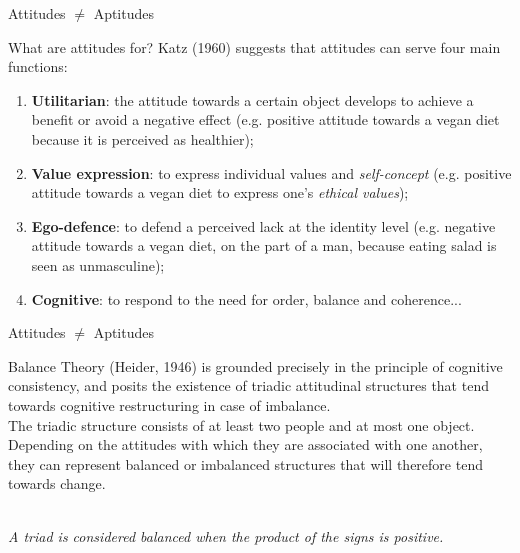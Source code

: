 \documentclass{beamer}
\begin{document}
\begin{frame}{Attitudes $\neq$ Aptitudes}
    \begin{block}{What are attitudes for?}
        Katz (1960) suggests that attitudes can serve four main functions: \\
        \small
    \begin{enumerate}
        \item \textbf{Utilitarian}: the attitude towards a certain object develops to achieve a benefit or avoid a negative effect (e.g. positive attitude towards a vegan diet because it is perceived as healthier);
        \item \textbf{Value expression}: to express individual values and \textit{self-concept} (e.g. positive attitude towards a vegan diet to express one's \textit{ethical values});
        \item \textbf{Ego-defence}: to defend a perceived lack at the identity level (e.g. negative attitude towards a vegan diet, on the part of a man, because eating salad is seen as unmasculine);
        \item \textbf{Cognitive}: to respond to the need for order, balance and coherence...
    \end{enumerate}
    \end{block}
\end{frame}

\begin{frame}{Attitudes $\neq$ Aptitudes}
    \footnotesize
    \begin{block}{Balance Theory (Heider, 1946)}
        is grounded precisely in the principle of cognitive consistency, and posits the existence of triadic attitudinal structures that tend towards cognitive restructuring in case of imbalance. \\
        The triadic structure consists of at least two people and at most one object. Depending on the attitudes with which they are associated with one another, they can represent balanced or imbalanced structures that will therefore tend towards change. \\
        \vspace{0.5em}
        \centering
        \\
        \vspace{0.5em}
        \textit{\scriptsize A triad is considered balanced when the product of the signs is positive.} \\
    \end{block}
\end{frame}
\end{document}
